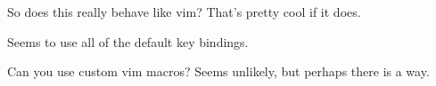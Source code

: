 %
%
\justification          %

So does this really behave like vim? That's pretty cool if it does.

Seems to use all of the default key bindings.

Can you use custom vim macros? Seems unlikely, but perhaps there is a way.